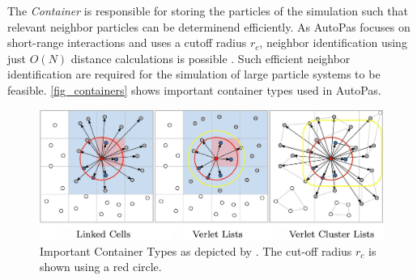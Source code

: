 \documentclass[conference]{IEEEtran}
\begin{document}
The \textit{Container} is responsible for storing the particles of the simulation such that relevant neighbor particles can be determinend efficiently. As AutoPas focuses on short-range interactions and uses a cutoff radius $r_c$, neighbor identification using just $O(N)$ distance calculations is possible \cite{Gratl2019AutoPas}. Such efficient neighbor identification are required for the simulation of large particle systems to be feasible. \autoref{fig_containers} shows important container types used in AutoPas.

\begin{figure}[h]
    \centering
    \includegraphics[width=\columnwidth]{figures/containers.jpg}
    \caption{Important Container Types as depicted by \cite{Gratl2022AutoPas}. The cut-off radius $r_c$ is shown using a red circle.}
    \label{fig_containers}
\end{figure}
\end{document}

